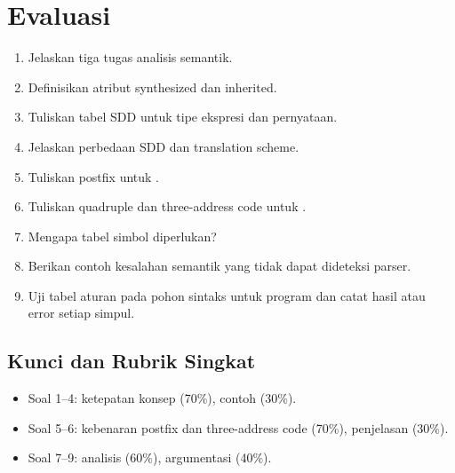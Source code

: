 \section*{Evaluasi}

\begin{enumerate}[label=\arabic*.,leftmargin=*]
  \item Jelaskan tiga tugas analisis semantik.
  \item Definisikan atribut synthesized dan inherited.
  \item Tuliskan tabel SDD untuk tipe ekspresi dan pernyataan.
  \item Jelaskan perbedaan SDD dan translation scheme.
  \item Tuliskan postfix untuk .
  \item Tuliskan quadruple dan three-address code untuk
        .
  \item Mengapa tabel simbol diperlukan?
  \item Berikan contoh kesalahan semantik yang tidak dapat dideteksi
        parser.
  \item Uji tabel aturan pada pohon sintaks untuk program
         dan catat hasil atau error
        setiap simpul.
\end{enumerate}

\subsection*{Kunci dan Rubrik Singkat}
\begin{itemize}[leftmargin=*]
  \item Soal 1--4: ketepatan konsep (70\%), contoh (30\%).
  \item Soal 5--6: kebenaran postfix dan three-address code (70\%),
        penjelasan (30\%).
  \item Soal 7--9: analisis (60\%), argumentasi (40\%).
\end{itemize}
